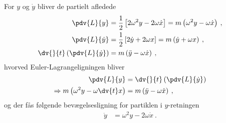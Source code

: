 \noindent
For $y$ og $\dot{y}$ bliver de partielt afledede
%
\begin{align}
	\pdv{L}{y} &= \frac{1}{2} \left[ 2 \omega^2y - 2\omega\dot{x} \right] = m \left( \omega^2y - \omega \dot{x} \right) \: , \\
	\pdv{L}{\dot{y}} &= \frac{1}{2} \left[2 \dot{y} + 2 \omega x \right] = m \left( \dot{y} + \omega x \right) \: , \\
	\dv{}{t} \left(\pdv{L}{\dot{y}}\right) &= m \left( \ddot{y} - \omega \dot{x} \right) \: ,
\end{align}
%
hvorved Euler-Lagrangeligningen bliver
%
\begin{align}
	\pdv{L}{y} &= \dv{}{t} \left(\pdv{L}{\dot{y}}\right) \nonumber \\
	\Rightarrow m \left( \omega^2 y-\omega \dv{t} x \right) &= m \left( \ddot{y} - \omega \dot{x} \right) \: ,
\end{align}
%
og der fås følgende bevægelsesligning for partiklen i $y$-retningen
%
\begin{align} \label{mek:eq:yKarrusel}
	\ddot{y} &= \omega^2y - 2 \omega \dot{x} \: .
\end{align}

